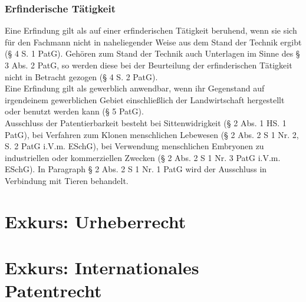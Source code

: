 \subsubsection{Erfinderische Tätigkeit}
Eine Erfindung gilt als auf einer erfinderischen Tätigkeit beruhend, wenn sie sich für den Fachmann
nicht in naheliegender Weise aus dem Stand der Technik ergibt (§ 4 S. 1 PatG). Gehören zum Stand
der Technik auch Unterlagen im Sinne des § 3 Abs. 2 PatG, so werden diese bei der Beurteilung der
erfinderischen Tätigkeit nicht in Betracht gezogen (§ 4 S. 2 PatG).
\\
Eine Erfindung gilt als gewerblich anwendbar, wenn ihr Gegenstand auf irgendeinem gewerblichen
Gebiet einschließlich der Landwirtschaft hergestellt oder benutzt werden kann (§ 5 PatG).
\\
Ausschluss der Patentierbarkeit besteht bei Sittenwidrigkeit (§ 2 Abs. 1 HS. 1 PatG), 
bei Verfahren zum Klonen menschlichen Lebewesen (§ 2 Abs. 2 S 1 Nr. 2, S. 2 PatG i.V.m. ESchG), 
bei Verwendung menschlichen Embryonen zu industriellen 
oder kommerziellen Zwecken (§ 2 Abs. 2 S 1 Nr. 3 PatG i.V.m. ESchG). In Paragraph § 2 Abs. 2 S 1 Nr. 1 PatG wird der Ausschluss in Verbindung mit Tieren behandelt.

\section{Exkurs: Urheberrecht\label{sec:urh}}
\section{Exkurs: Internationales Patentrecht\label{sec:urh}}


